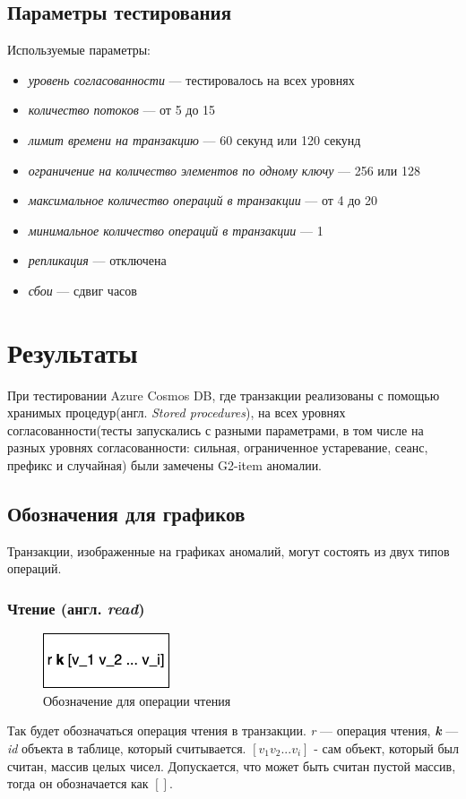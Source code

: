 \documentclass[12pt,  openany]{book}
\begin{document}
\subsection{Параметры тестирования}
Используемые параметры:
\begin{itemize}
\item[] \textit{уровень согласованности} --- тестировалось на всех уровнях
\item[] \textit{количество потоков} --- от 5 до 15
\item[] \textit{лимит времени на транзакцию} --- 60 секунд или 120 секунд
\item[] \textit{ограничение на количество элементов по одному ключу} --- 256 или 128
\item[] \textit{максимальное количество операций в транзакции} --- от 4 до 20
\item[] \textit{минимальное количество операций в транзакции} --- 1
\item[] \textit{репликация} --- отключена
\item[] \textit{сбои} --- сдвиг часов
\end{itemize}


\section{Результаты}
При тестировании Azure Cosmos DB, где транзакции реализованы с помощью хранимых процедур(англ. \textit{Stored procedures}), на всех уровнях согласованности(тесты запускались с разными параметрами, в том числе на разных уровнях согласованности: сильная, ограниченное устаревание, сеанс, префикс и случайная) были замечены G2-item  аномалии. 

\subsection{Обозначения для графиков}
Транзакции, изображенные на графиках аномалий, могут состоять из двух типов операций.
\subsubsection{Чтение (англ. \textit{read})}
\begin{figure}[H]
\centering
  \includegraphics[scale=1.0]{images/read.png}
  \caption{Обозначение для операции чтения}
\end{figure}
Так будет обозначаться операция чтения в транзакции. \textit{r} --- операция чтения, \textit{\textbf{k}} --- \textit{id} объекта в таблице, который считывается. $[v_1 v_2 ... v_i]$ - сам объект, который был считан, массив целых чисел. Допускается, что может быть считан пустой массив, тогда он обозначается как $[]$.
\end{document}
